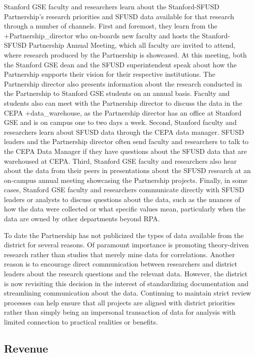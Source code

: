 \documentclass[
]{book}
\begin{document}
Stanford GSE faculty and researchers learn about the Stanford-SFUSD Partnership's research priorities and SFUSD data available for that research through a number of channels. First and foremost, they learn from the +Partnership\_director\textbar{} who on-boards new faculty and hosts the Stanford-SFUSD Partnership Annual Meeting, which all faculty are invited to attend, where research produced by the Partnership is showcased. At this meeting, both the Stanford GSE dean and the SFUSD superintendent speak about how the Partnership supports their vision for their respective institutions. The Partnership director also presents information about the research conducted in the Partnership to Stanford GSE students on an annual basis. Faculty and students also can meet with the Partnership director to discuss the data in the CEPA +data\_warehouse\textbar, as the Partnership director has an office at Stanford GSE and is on campus one to two days a week. Second, Stanford faculty and researchers learn about SFUSD data through the CEPA data manager. SFUSD leaders and the Partnership director often send faculty and researchers to talk to the CEPA Data Manager if they have questions about the SFUSD data that are warehoused at CEPA. Third, Stanford GSE faculty and researchers also hear about the data from their peers in presentations about the SFUSD research at an on-campus annual meeting showcasing the Partnership projects. Finally, in some cases, Stanford GSE faculty and researchers communicate directly with SFUSD leaders or analysts to discuss questions about the data, such as the nuances of how the data were collected or what specific values mean, particularly when the data are owned by other departments beyond RPA.

To date the Partnership has not publicized the types of data available from the district for several reasons. Of paramount importance is promoting theory-driven research rather than studies that merely mine data for correlations. Another reason is to encourage direct communication between researchers and district leaders about the research questions and the relevant data. However, the district is now revisiting this decision in the interest of standardizing documentation and streamlining communication about the data. Continuing to maintain strict review processes can help ensure that all projects are aligned with district priorities rather than simply being an impersonal transaction of data for analysis with limited connection to practical realities or benefits.

\hypertarget{revenue-4}{%
\subsection{Revenue}\label{revenue-4}}
\end{document}

